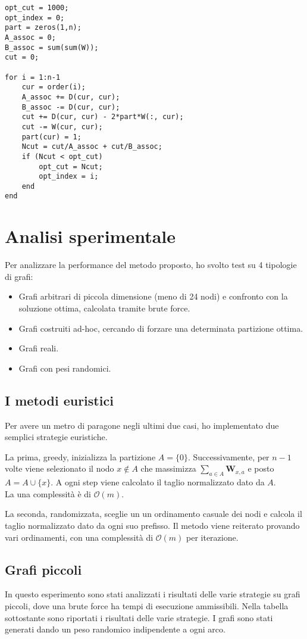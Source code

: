\documentclass{article}
\newcommand{\W}{\mathbf{W}}
\begin{document}
\begin{multicols}{2}
\begin{lstlisting}[style=Matlab-editor]
opt_cut = 1000;
opt_index = 0;
part = zeros(1,n);
A_assoc = 0;
B_assoc = sum(sum(W));
cut = 0;

for i = 1:n-1
    cur = order(i);
    A_assoc += D(cur, cur);
    B_assoc -= D(cur, cur);
    cut += D(cur, cur) - 2*part*W(:, cur);
    cut -= W(cur, cur);
    part(cur) = 1;
    Ncut = cut/A_assoc + cut/B_assoc;
    if (Ncut < opt_cut)
        opt_cut = Ncut;
        opt_index = i;
    end
end
\end{lstlisting}


\section{Analisi sperimentale}

Per analizzare la performance del metodo proposto, ho svolto test su 4 tipologie di grafi:
\begin{itemize}
    \item Grafi arbitrari di piccola dimensione (meno di 24 nodi) e confronto con la soluzione ottima, calcolata tramite brute force.
    \item Grafi costruiti ad-hoc, cercando di forzare una determinata partizione ottima.
    \item Grafi reali.
    \item Grafi con pesi randomici.
\end{itemize}

\subsection{I metodi euristici}
Per avere un metro di paragone negli ultimi due casi, ho implementato due semplici strategie euristiche.\\
\par
La prima, greedy, inizializza la partizione $A = \{0\}$. Successivamente, per $n-1$ volte viene selezionato il nodo $x \notin A$ che massimizza $\sum_{a \in A} \W_{x,a}$ e posto $A = A \cup \{x\}$.
A ogni step viene calcolato il taglio normalizzato dato da $A$.\\
La una complessit\`a \`e di $\mathcal{O}(m)$.
\par
La seconda, randomizzata, sceglie un un ordinamento casuale dei nodi e calcola il taglio normalizzato dato da ogni suo prefisso.
Il metodo viene reiterato provando vari ordinamenti, con una complessit\`a di $\mathcal{O}(m)$ per iterazione.

\subsection{Grafi piccoli}
In questo esperimento sono stati analizzati i risultati delle varie strategie
su grafi piccoli, dove una brute force ha tempi di esecuzione ammissibili.
Nella tabella sottostante sono riportati i risultati delle varie strategie.
I grafi sono stati generati dando un peso randomico indipendente a ogni arco.


\end{multicols}
\end{document}
